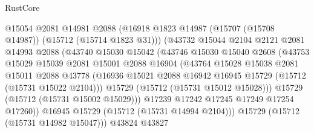 \begin{lexlean}{RustCore}
\begin{coremodule}
                            @15054
                            @2081
                            @14981
                            @2088
                            (@16918
                              @1823
                              @14987
                              (@15707 (@15708 @14987))
                              (@15712 (@15714 @1823 @31)))
                            (@43732
                              @15044
                              @2104
                              @2121
                              @2081
                              @14993
                              @2088
                              (@43740
                                @15030
                                @15042
                                (@43746
                                  @15030
                                  @15040
                                  @2608
                                  (@43753
                                    @15029
                                    @15039
                                    @2081
                                    @15001
                                    @2088
                                    @16904
                                    (@43764
                                      @15028
                                      @15038
                                      @2081
                                      @15011
                                      @2088
                                      @43778
                                      (@16936
                                        @15021
                                        @2088
                                        @16942
                                        @16945
                                        @15729
                                        (@15712 (@15731 @15022 @2104)))
                                      @15729
                                      (@15712 (@15731 @15012 @15028)))
                                    @15729
                                    (@15712 (@15731 @15002 @15029)))
                                  @17239
                                  @17242
                                  @17245
                                  @17249
                                  @17254
                                  @17260))
                              @16945
                              @15729
                              (@15712 (@15731 @14994 @2104)))
                            @15729
                            (@15712 (@15731 @14982 @15047)))
                          @43824
                          @43827

\end{coremodule}
\end{lexlean}
